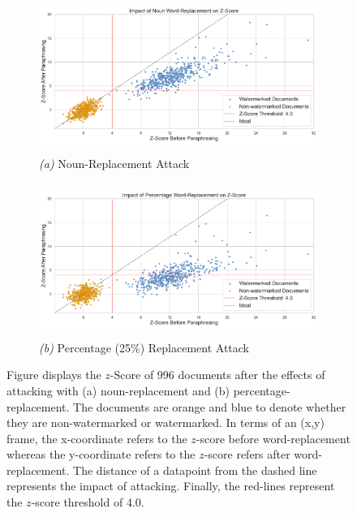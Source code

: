 \documentclass{l4proj}
\theoremstyle{definition}
\begin{document}
    \begin{figure}[ht]
            \centering
            \captionsetup[subfigure]{labelformat=empty}
            \begin{subfigure}{\textwidth}
                \centering
                \includegraphics[height=5cm, width=\linewidth, keepaspectratio]{images/results/z-score/noun word-replacement.pdf}
                \caption{\emph{(a)} Noun-Replacement Attack}
                \label{fig:noun-replacement-z-score}
            \end{subfigure}
            \begin{subfigure}{\textwidth}
                \centering
                \includegraphics[height=5cm, width=\linewidth, keepaspectratio]{images/results/z-score/percentage word-replacement.pdf}
                \caption{\emph{(b)} Percentage (25\%) Replacement Attack}
                \label{fig:percentage-replacement-z-score}
            \end{subfigure}
            \caption{Figure displays the $z$-Score of 996 documents after the effects of attacking with (a) noun-replacement and (b) percentage-replacement. The documents are orange and blue to denote whether they are non-watermarked or watermarked. In terms of an (x,y) frame, the x-coordinate refers to the $z$-score before word-replacement whereas the y-coordinate refers to the $z$-score refers after word-replacement. The distance of a datapoint from the dashed line represents the impact of attacking. Finally, the red-lines represent the $z$-score threshold of 4.0.}
            \label{fig:kpar3-sample-comparison}
    \end{figure}
\end{document}
